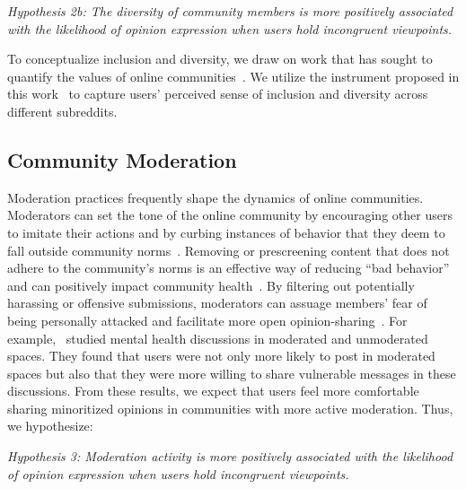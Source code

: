 \vspace{0.25em}
\begin{addmargin}[1.25em]{0em}
\textit{Hypothesis 2b: The diversity of community members is more positively associated with the likelihood of opinion expression when users hold incongruent viewpoints.}
\end{addmargin}
\vspace{0.25em}

To conceptualize inclusion and diversity, we draw on work that has sought to quantify the values of online communities~\cite{weld2022makes}. We utilize the instrument proposed in this work~\cite{weld2021making} to capture users' perceived sense of inclusion and diversity across different subreddits.


\subsection{Community Moderation}
Moderation practices frequently shape the dynamics of online communities. Moderators can set the tone of the online community by encouraging other users to imitate their actions and by curbing instances of behavior that they deem to fall outside community norms~\cite{seering2017shaping}. Removing or prescreening content that does not adhere to the community's norms is an effective way of reducing ``bad behavior'' and can positively impact community health~\cite{kraut2012building,seering2017shaping}. By filtering out potentially harassing or offensive submissions, moderators can assuage members' fear of being personally attacked and facilitate more open opinion-sharing~\cite{gibson2019free}. For example,~\citet{wadden2021effect} studied mental health discussions in moderated and unmoderated spaces. They found that users were not only more likely to post in moderated spaces but also that they were more willing to share vulnerable messages in these discussions. From these results, we expect that users feel more comfortable sharing minoritized opinions in communities with more active moderation. Thus, we hypothesize:

\vspace{0.25em}
\begin{addmargin}[1.25em]{0em}
\textit{Hypothesis 3: Moderation activity is more positively associated with the likelihood of opinion expression when users hold incongruent viewpoints.}
\end{addmargin}
\vspace{0.25em}

